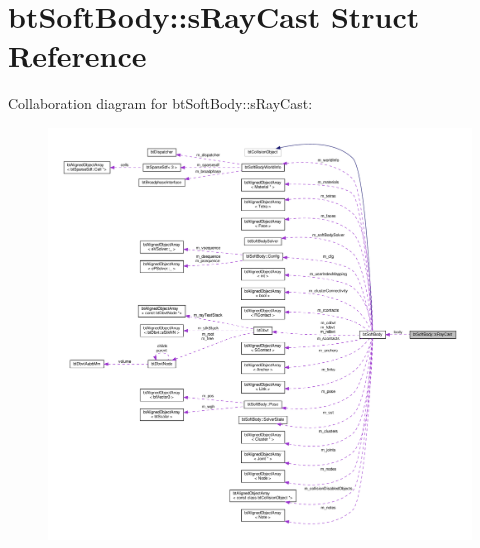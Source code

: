 \hypertarget{structbtSoftBody_1_1sRayCast}{}\section{bt\+Soft\+Body\+:\+:s\+Ray\+Cast Struct Reference}
\label{structbtSoftBody_1_1sRayCast}


Collaboration diagram for bt\+Soft\+Body\+:\+:s\+Ray\+Cast\+:
\nopagebreak
\begin{figure}[H]
\begin{center}
\leavevmode
\includegraphics[width=350pt]{structbtSoftBody_1_1sRayCast__coll__graph}
\end{center}
\end{figure}
